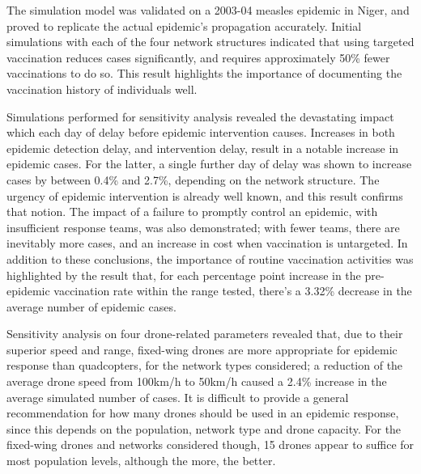 \documentclass[10pt,letterpaper]{article}
\begin{document}
The simulation model was validated on a 2003-04 measles epidemic in Niger, and proved to replicate the actual epidemic's propagation accurately. Initial simulations with each of the four network structures indicated that using targeted vaccination reduces cases significantly, and requires approximately 50\% fewer vaccinations to do so. This result highlights the importance of documenting the vaccination history of individuals well.

Simulations performed for sensitivity analysis revealed the devastating impact which each day of delay before epidemic intervention causes. Increases in both epidemic detection delay, and intervention delay, result in a notable increase in epidemic cases. For the latter, a single further day of delay was shown to increase cases by between 0.4\% and 2.7\%, depending on the network structure. The urgency of epidemic intervention is already well known, and this result confirms that notion. The impact of a failure to promptly control an epidemic, with insufficient response teams, was also demonstrated; with fewer teams, there are inevitably more cases, and an increase in cost when vaccination is untargeted. In addition to these conclusions, the importance of routine vaccination activities was highlighted by the result that, for each percentage point increase in the pre-epidemic vaccination rate within the range tested, there's a 3.32\% decrease in the average number of epidemic cases.

Sensitivity analysis on four drone-related parameters revealed that, due to their superior speed and range, fixed-wing drones are more appropriate for epidemic response than quadcopters, for the network types considered; a reduction of the average drone speed from 100km/h to 50km/h caused a 2.4\% increase in the average simulated number of cases. It is difficult to provide a general recommendation for how many drones should be used in an epidemic response, since this depends on the population, network type and drone capacity. For the fixed-wing drones and networks considered though, 15 drones appear to suffice for most population levels, although the more, the better.
\end{document}
